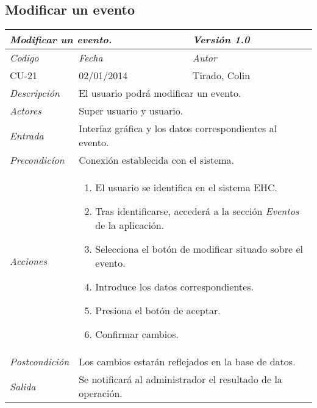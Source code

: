 \subsection{Modificar un evento}
\begin{center}
    \begin{tabular}{|p{3cm}|p{4cm}|p{4cm}|p{4cm}|}
    \hline \multicolumn{3}{|p{9cm}|}{\textit{Modificar un evento.}} & \textit{Versi\'on 1.0} \\
	\hline \textit{Codigo} & \textit{Fecha} & \multicolumn{2}{|p{6cm}|}{\textit{Autor}} \\
	CU-21 & 02/01/2014 & \multicolumn{2}{|p{6cm}|}{Tirado, Colin} \\		
    \hline \textit{Descripci\'on} & \multicolumn{3}{|p{9cm}|}{El usuario podr\'a modificar un evento.} \\
    \hline \textit{Actores} & \multicolumn{3}{|p{9cm}|}{Super usuario y usuario.} \\
    \hline \textit{Entrada} & \multicolumn{3}{|p{9cm}|}{Interfaz gr\'afica y los datos correspondientes al evento.} \\
    \hline \textit{Precondic\'ion} & \multicolumn{3}{|p{9cm}|}{Conexi\'on establecida con el sistema.} \\
    \hline \textit{Acciones} & \multicolumn{3}{|p{9cm}|}{
        \begin{enumerate}
        \item El usuario se identifica en el sistema EHC.
        \item Tras identificarse, acceder\'a a la secci\'on \textit{Eventos} de la aplicaci\'on.
        \item Selecciona el bot\'on de modificar situado sobre el evento.
        \item Introduce los datos correspondientes.
        \item Presiona el bot\'on de aceptar.
        \item Confirmar cambios.
        \end{enumerate}
           } \\
    \hline \textit{Postcondici\'on} & \multicolumn{3}{|p{9cm}|}{Los cambios estar\'an reflejados en la base de datos.} \\
    \hline \textit{Salida} & \multicolumn{3}{|p{9cm}|}{Se notificar\'a al administrador el resultado de la operaci\'on.} \\ \hline
    \end{tabular}
\end{center}